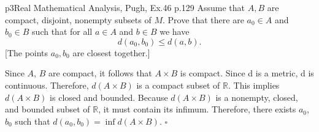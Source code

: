 \begin{problem}{}{p3}{Real Mathematical Analysis, Pugh, Ex.46 p.129}
Assume that $A, B$ are compact, disjoint, nonempty subsets of $M$. Prove that there are $a_0 \in A$ and $b_0 \in B$ such that for all $a \in A$ and $b \in B$ we have
$$d(a_0, b_0) \le d(a,b).$$
[The points $a_0, b_0$ are closest together.]
\end{problem}

\begin{solution}
    Since \(A\), \(B\) are compact, it follows that \(A \times B\) is compact.
    Since d is a metric, d is continuous. Therefore, \(d(A \times B)\) is a 
    compact subset of \(\mathbb{R}\). This implies \(d(A \times B)\) is closed and bounded. 
    Because \(d(A \times B)\) is a nonempty, closed, and bounded subset of \(\mathbb{R}\), it must contain its infimum. 
    Therefore, there exists \(a_0\), \(b_0\) such that \(d(a_0, b_0) = \inf d(A \times B)\). 
    \hfill $\square$
\end{solution}